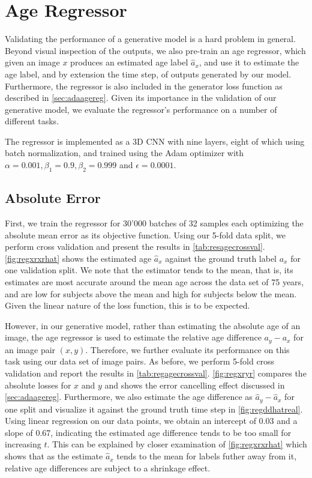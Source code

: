 \section{Age Regressor} \label{sec:expagereg}
Validating the performance of a generative model is a hard problem in general. Beyond visual inspection of the outputs, we also pre-train an age regressor, which given an image $x$ produces an estimated age label $\hat a_x$, and use it to estimate the age label, and by extension the time step, of outputs generated by our model. Furthermore, the regressor is also included in the generator loss function as described in \autoref{sec:adaagereg}. Given its importance in the validation of our generative model, we evaluate the regressor's performance on a number of different tasks.

The regressor is implemented as a 3D CNN with nine layers, eight of which using batch normalization, and trained using the Adam optimizer with $\alpha = 0.001, \beta_1 = 0.9, \beta_2 = 0.999 $ and $ \epsilon = 0.0001 $.

\subsection*{Absolute Error}
First, we train the regressor for 30'000 batches of 32 samples each optimizing the absolute mean error as its objective function. Using our 5-fold data split, we perform cross validation and present the results in \autoref{tab:resagecrossval}. \autoref{fig:regxrxrhat} shows the estimated age $ \hat a_x $ against the ground truth label $a_x$ for one validation split. We note that the estimator tends to the mean, that is, its estimates are most accurate around the mean age across the data set of 75 years, and are low for subjects above the mean and high for subjects below the mean. Given the linear nature of the loss function, this is to be expected.

However, in our generative model, rather than estimating the absolute age of an image, the age regressor is used to estimate the relative age difference $a_y - a_x$ for an image pair $(x, y)$. Therefore, we further evaluate its performance on this task using our data set of image pairs. As before, we perform 5-fold cross validation and report the results in \autoref{tab:regagecrossval}. \autoref{fig:regxryr} compares the absolute losses for $x$ and $y$ and shows the error cancelling effect discussed in \autoref{sec:adaagereg}. Furthermore, we also estimate the age difference as $\hat a_y - \hat a_x$ for one split and visualize it against the ground truth time step in \autoref{fig:regddhatreal}. Using linear regression on our data points, we obtain an intercept of 0.03 and a slope of 0.67, indicating the estimated age difference tends to be too small for increasing $t$. This can be explained by closer examination of \autoref{fig:regxrxrhat} which shows that as the estimate $\hat a_x$ tends to the mean for labels futher away from it, relative age differences are subject to a shrinkage effect. 

